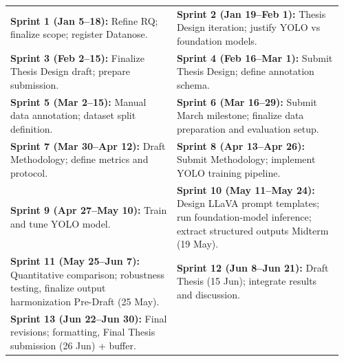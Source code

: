 \begin{center}
\small
\begin{tabular}{p{0.48\linewidth} p{0.48\linewidth}}

\textbf{Sprint 1 (Jan 5--18):} Refine RQ; finalize scope; register Datanose. &
\textbf{Sprint 2 (Jan 19--Feb 1):} Thesis Design iteration; justify YOLO vs foundation models. \\

\textbf{Sprint 3 (Feb 2--15):} Finalize Thesis Design draft; prepare submission. &
\textbf{Sprint 4 (Feb 16--Mar 1):} Submit Thesis Design; define annotation schema. \\

\textbf{Sprint 5 (Mar 2--15):} Manual data annotation; dataset split definition. &
\textbf {Sprint 6 (Mar 16--29):} Submit March milestone; finalize data preparation and evaluation setup. \\

\textbf{Sprint 7 (Mar 30--Apr 12):} Draft Methodology; define metrics and protocol. &
\textbf{Sprint 8 (Apr 13--Apr 26):} Submit Methodology; implement YOLO training pipeline. \\

\textbf{Sprint 9 (Apr 27--May 10):} Train and tune YOLO model. &
\textbf{Sprint 10 (May 11--May 24):} Design LLaVA prompt templates; run foundation-model inference; extract structured outputs Midterm (19 May). \\

\textbf{Sprint 11 (May 25--Jun 7):} Quantitative comparison; robustness testing, finalize output harmonization Pre-Draft (25 May). &
\textbf{Sprint 12 (Jun 8--Jun 21):} Draft Thesis (15 Jun); integrate results and discussion. \\
\textbf{Sprint 13 (Jun 22--Jun 30):} Final revisions; formatting, Final Thesis submission (26 Jun) + buffer.\\

\end{tabular}
\end{center} 


